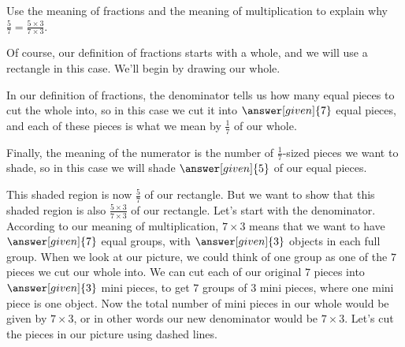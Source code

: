 \documentclass{ximera}
\begin{document}
\begin{example}
Use the meaning of fractions and the meaning of multiplication to explain why $\frac{5}{7} = \frac{5 \times 3}{7 \times 3}$. 

Of course, our definition of fractions starts with a whole, and we will use a rectangle in this case. We'll begin by drawing our whole. 

\begin{image}
\end{image}
In our definition of fractions, the denominator tells us how many equal pieces to cut the whole into, so in this case we cut it into $\answer[given]{7}$ equal pieces, and each of these pieces is what we mean by $\frac{1}{7}$ of our whole. 

\begin{image}
\end{image}
Finally, the meaning of the numerator is the number of $\frac{1}{7}$-sized pieces we want to shade, so in this case we will shade $\answer[given]{5}$ of our equal pieces. 

\begin{image}
\end{image}
This shaded region is now $\frac{5}{7}$ of our rectangle. But we want to show that this shaded region is also $\frac{5 \times 3}{7 \times 3}$ of our rectangle. Let's start with the denominator.  According to our meaning of multiplication, $7 \times 3$ means that we want to have $\answer[given]{7}$ equal groups, with $\answer[given]{3}$ objects in each full group. When we look at our picture, we could think of one group as one of the $7$ pieces we cut our whole into. We can cut each of our original $7$ pieces into $\answer[given]{3}$ mini pieces, to get $7$ groups of $3$ mini pieces, where one mini piece is one object. Now the total number of mini pieces in our whole would be given by $7 \times 3$, or in other words our new denominator would be $7 \times 3$. Let's cut the pieces in our picture using dashed lines.


\end{example}
\end{document}
